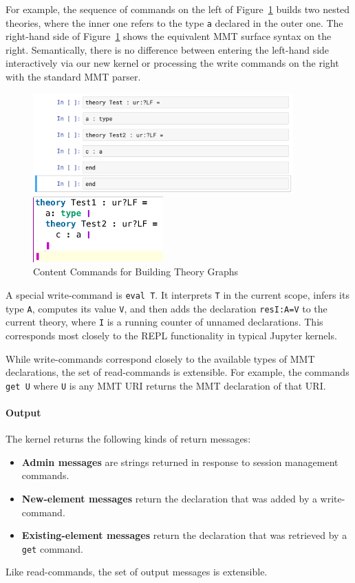 For example, the sequence of commands on the left of Figure~\ref{fig:test_theory} builds two nested theories, where the inner one refers to the type \texttt{a} declared in the outer one.
The right-hand side of Figure~\ref{fig:test_theory} shows the equivalent MMT surface syntax on the right.
Semantically, there is no difference between entering the left-hand side interactively via our new kernel or processing the write commands on the right with the standard MMT parser.
\begin{figure}[ht]\centering
\begin{minipage}[c]{10cm}\includegraphics[width=10cm]{test_theory_jupyter}\end{minipage}
\begin{minipage}[c]{5cm}\includegraphics[width=5cm]{test_theory}\end{minipage}
\caption{Content Commands for Building Theory Graphs}\label{fig:test_theory}
\end{figure}

A special write-command is \texttt{eval T}.
It interprets \texttt{T} in the current scope, infers its type \texttt{A}, computes its value \texttt{V}, and then adds the declaration \texttt{resI:A=V} to the current theory, where \texttt{I} is a running counter of unnamed declarations.
This corresponds most closely to the REPL functionality in typical Jupyter kernels.

While write-commands correspond closely to the available types of MMT declarations, the set of read-commands is extensible.
For example, the commands \texttt{get U} where \texttt{U} is any MMT URI returns the MMT declaration of that URI.

\paragraph{Output}
The kernel returns the following kinds of return messages:
\begin{itemize}
\item \textbf{Admin messages} are strings returned in response to session management commands.
\item \textbf{New-element messages} return the declaration that was added by a write-command.
\item \textbf{Existing-element messages} return the declaration that was retrieved by a \texttt{get} command.
\end{itemize}
Like read-commands, the set of output messages is extensible.

